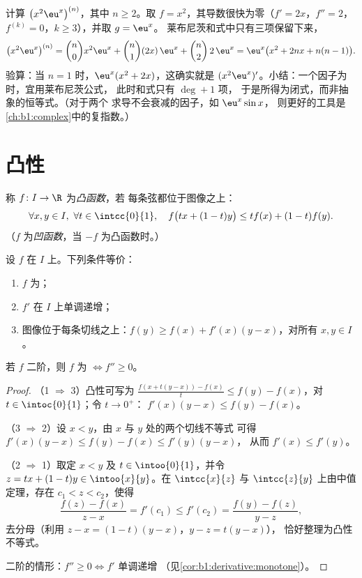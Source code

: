 \begin{example}[莱布尼茨公式的应用]\label{ex:b1:derivative:leibnizaction}
计算 $\bigl(x^2 \eu^x\bigr)^{(n)}$，其中 $n \geq 2$。取 $f =
x^2$，其导数很快为零（$f' = 2x$，$f'' = 2$，
$f^{(k)} = 0$，$k \geq 3$），并取 $g = \eu^x$。
莱布尼茨和式中只有三项保留下来，
\[
\bigl(x^2\eu^x\bigr)^{(n)}
= \binom n0 x^2 \eu^x + \binom n1 (2x)\,\eu^x + \binom n2\,
2\,\eu^x
= \eu^x\bigl(x^2 + 2nx + n(n-1)\bigr).
\]
验算：当 $n = 1$ 时，$\eu^x(x^2 + 2x)$，这确实就是
$(x^2\eu^x)'$。小结：一个因子为时，宜用莱布尼茨公式，
此时和式只有 $\deg + 1$ 项，
于是所得为闭式，而非抽象的恒等式。（对于两个
求导不会衰减的因子，如 $\eu^x\sin x$，
则更好的工具是\cref{ch:b1:complex}中的复指数。）
\end{example}

\section{凸性}

\begin{definition}\label{def:b1:derivative:convex}
称 $f \colon I \to \R$ 为\emph{凸函数}，若
每条弦都位于图像之上：
\[
\forall x, y \in I,\ \forall t \in \intcc{0}{1}, \quad
f\bigl(tx + (1-t)y\bigr) \leq t f(x) + (1-t) f(y).
\]
（$f$ 为\emph{凹函数}，当 $-f$ 为凸函数时。）
\end{definition}

\begin{theorem}[凸性的微分刻画]\label{thm:b1:derivative:convexchar}
设 $f$ 在 $I$ 上。下列条件等价：
\begin{enumerate}
  \item $f$ 为；
  \item $f'$ 在 $I$ 上单调递增；
  \item 图像位于每条切线之上：$f(y) \geq f(x) +
        f'(x)(y - x)$，对所有 $x, y \in I$。
\end{enumerate}
若 $f$ 二阶，则 $f$ 为 $\iff f'' \geq 0$。
\end{theorem}

\begin{proof}
（1 $\Rightarrow$ 3）凸性可写为 $\frac{f(x + t(y-x)) -
f(x)}{t} \leq f(y) - f(x)$，对 $t \in \intoc{0}{1}$；令 $t \to 0^+$：
$f'(x)(y - x) \leq f(y) - f(x)$。

（3 $\Rightarrow$ 2）设 $x < y$，由 $x$ 与 $y$ 处的两个切线不等式
可得 $f'(x)(y-x) \leq f(y) - f(x) \leq f'(y)(y - x)$，
从而 $f'(x) \leq f'(y)$。

（2 $\Rightarrow$ 1）取定 $x < y$ 及 $t \in \intoo{0}{1}$，并令 $z
= tx + (1-t)y \in \intoo{x}{y}$。在
$\intcc{x}{z}$ 与 $\intcc{z}{y}$ 上由中值定理，存在 $c_1 < z < c_2$，使得
\[
\frac{f(z) - f(x)}{z - x} = f'(c_1) \leq f'(c_2)
= \frac{f(y) - f(z)}{y - z} ,
\]
去分母（利用 $z - x = (1-t)(y-x)$，$y - z = t(y-x)$），
恰好整理为凸性不等式。

二阶的情形：$f'' \geq 0 \iff f'$ 单调递增
（见\cref{cor:b1:derivative:monotone}）。
\end{proof}

